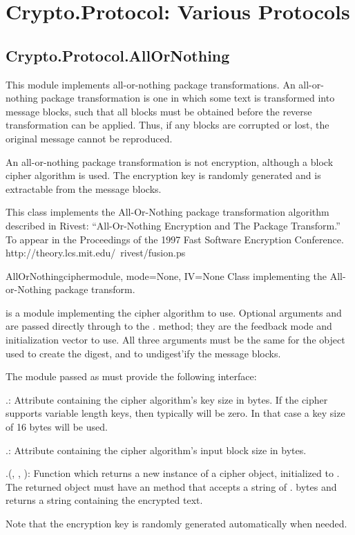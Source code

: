 \documentclass{howto}
\begin{document}
\section{Crypto.Protocol: Various Protocols}

\subsection{Crypto.Protocol.AllOrNothing}

This module implements all-or-nothing package transformations.
An all-or-nothing package transformation is one in which some text is
transformed into message blocks, such that all blocks must be obtained before
the reverse transformation can be applied.  Thus, if any blocks are corrupted
or lost, the original message cannot be reproduced.

An all-or-nothing package transformation is not encryption, although a block
cipher algorithm is used.  The encryption key is randomly generated and is
extractable from the message blocks.

This class implements the All-Or-Nothing package transformation
algorithm described in Rivest: ``All-Or-Nothing Encryption and The
Package Transform.''  To appear in the Proceedings of the 1997 Fast
Software Encryption Conference.
http://theory.lcs.mit.edu/~rivest/fusion.ps

\begin{classdesc}{AllOrNothing}{ciphermodule, mode=None, IV=None}
Class implementing the All-or-Nothing package transform.

 is a module implementing the cipher algorithm to
use.  Optional arguments  and  are passed directly
through to the . method; they are the
feedback mode and initialization vector to use.  All three arguments
must be the same for the object used to create the digest, and to
undigest'ify the message blocks.

The module passed as  must provide the
following interface:

.: 
Attribute containing the cipher algorithm's key size in
bytes.  If the cipher supports variable length keys, then
typically  will be zero.  In that case a
key size of 16 bytes will be used.

.: 
Attribute containing the cipher algorithm's input block size
in bytes.

.(, , ):
                Function which returns a new instance of a cipher object,
                initialized to .  The returned object must have an
                 method that accepts a string of
                . bytes and returns a string containing
                the encrypted text.

Note that the encryption key is randomly generated automatically
when needed.  
\end{classdesc}
\end{document}
